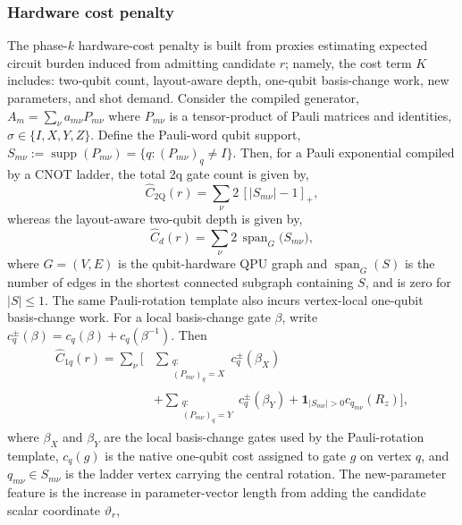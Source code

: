\documentclass[
  reprint,
  amsmath,
  amssymb,
  aps,
  pra,
  nofootinbib,
  superscriptaddress,
  floatfix
]{revtex4-2}
\newcommand{\twq}{\mathrm{2Q}}
\begin{document}
\subsubsection{Hardware cost penalty}

The phase-$k$ hardware-cost penalty is built from proxies estimating expected circuit burden induced from admitting candidate $r$; namely, the cost term $K$ includes: two-qubit count, layout-aware depth, one-qubit basis-change work, new parameters, and shot demand. Consider the compiled generator, $A_m=\sum_{\nu}a_{m\nu}P_{m\nu}$ where $P_{m\nu}$ is a tensor-product of Pauli matrices and identities, $\sigma \in \{I,X,Y,Z\}$. Define the Pauli-word qubit support, $S_{m\nu}:=\operatorname{supp}(P_{m\nu})=\{q:(P_{m\nu})_q\ne I\}$. Then, for a Pauli exponential compiled by a CNOT ladder, the total 2q gate count is given by,
\begin{equation}
\widehat C_{\twq}(r)=\sum_{\nu}2\,[|S_{m\nu}|-1]_+,
\label{eq:pauli_2count_proxy}
\end{equation}
whereas the layout-aware two-qubit depth is given by,
\begin{equation}
\widehat C_d(r)=\sum_{\nu}2\,\operatorname{span}_{G}
\bigl(S_{m\nu}\bigr),
\label{eq:pauli_2depth_proxy}
\end{equation}
where $G=(V,E)$ is the qubit-hardware QPU graph and $\operatorname{span}_{G}(S)$ is the number of edges in the shortest connected subgraph containing $S$, and is zero for $|S|\le1$. The same Pauli-rotation template also incurs vertex-local one-qubit basis-change work. For a local basis-change gate $\beta$, write \(c_q^{\pm}(\beta)=c_q(\beta)+c_q(\beta^{-1})\). Then
\begin{equation}
\begin{aligned}
\widehat C_{1q}(r)
=
\sum_{\nu}
\Bigg[
&\sum_{\substack{q:\\(P_{m\nu})_q=X}}
c_q^{\pm}(\beta_X)\\
&+
\sum_{\substack{q:\\(P_{m\nu})_q=Y}}
c_q^{\pm}(\beta_Y)
+
\mathbf 1_{|S_{m\nu}|>0}c_{q_{m\nu}}(R_z)
\Bigg],
\end{aligned}
\label{eq:pauli_1count_proxy}
\end{equation}
where $\beta_X$ and $\beta_Y$ are the local basis-change gates used by the Pauli-rotation template, $c_q(g)$ is the native one-qubit cost assigned to gate $g$ on vertex $q$, and $q_{m\nu}\in S_{m\nu}$ is the ladder vertex carrying the central rotation. The new-parameter feature is the increase in parameter-vector length from adding the candidate scalar coordinate $\vartheta_r$,
\end{document}
